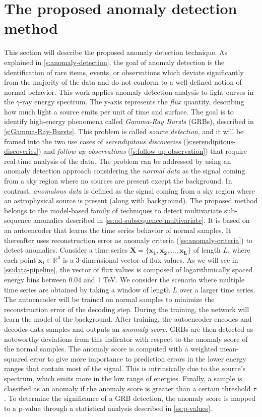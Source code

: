\section{The proposed anomaly detection method}
\label{s:contribution}
This section will describe the proposed anomaly detection technique. As explained in \autoref{s:anomaly-detection}, the goal of anomaly detection is the identification of rare items, events, or observations which deviate significantly from the majority of the data and do not conform to a well-defined notion of normal behavior.
This work applies anomaly detection analysis to light curves in the $\gamma$-ray energy spectrum. The y-axis represents the \textit{flux} quantity,  describing how much light a source emits per unit of time and surface. The goal is to identify high-energy phenomena called \textit{Gamma-Ray Bursts} (GRBs), described in \autoref{s:Gamma-Ray-Bursts}. This problem is called \textit{source detection}, and it will be framed into the two  use cases of \textit{serendipitous discoveries} (\autoref{s:serendipitous-discoveries}) and \textit{follow-up observations} (\autoref{s:follow-up-observation}) that require real-time analysis of the data. The problem can be addressed by using an anomaly detection approach considering the \textit{normal data} as the signal coming from a sky region where no sources are present except the background. In contrast, \textit{anomalous data} is defined as the signal coming from a sky region where an astrophysical source is present (along with background).
The proposed method belongs to the model-based family of techniques to detect multivariate sub-sequence anomalies described in \autoref{ss:ad-subsequence-multivariate}. It is based on an autoencoder that learns the time series behavior of normal samples. It thereafter uses reconstruction error as anomaly criteria (\autoref{ss:anomaly-criteria}) to detect anomalies. 
Consider a time series $\bm{X} = \{\bm{x_1}, \bm{x_2}, ..., \bm{x_L}\}$ of length $L$, where each point $\bm{x_i} \in \mathbb{R}^3$ is a 3-dimensional vector of flux values. As we will see in \autoref{ss:data-pipeline}, 
the vector of flux values is composed of logarithmically spaced energy bins between 0.04 and 1 TeV. We consider the scenario where multiple  time series are obtained by taking a window of length $L$ over a larger time series. The autoencoder will be trained on normal samples to minimize the reconstruction error of the decoding step. During the training, the network will learn the model of the background. After training, the autoencoder encodes and decodes data samples and outputs an \textit{anomaly score}. GRBs are then detected as noteworthy deviations from this indicator with respect to the anomaly score of the normal samples. The anomaly score is computed with a weighted mean-squared error to give more importance to prediction errors in the lower energy ranges that contain most of the signal. This is intrinsically due to the source's spectrum, which emits more in the low range of energies. Finally, a sample is classified as an anomaly if the anomaly score is greater than a certain threshold $\tau$. To determine the significance of a GRB detection, the anomaly score is mapped to a p-value through a statistical analysis described in \autoref{ss:p-values}. 

